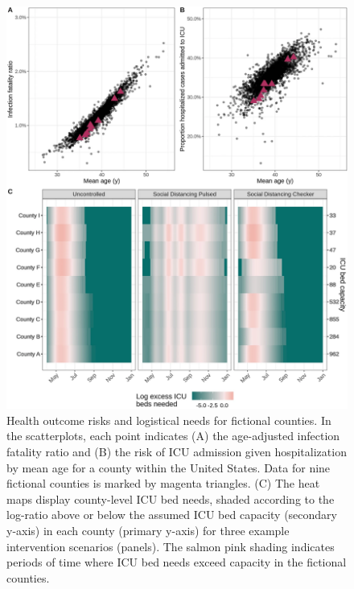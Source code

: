 {\begin{figure}[!htb]%
    \centering
    \includegraphics{fig_pipeline/fig3a}
    \caption[Health outcome risks and logistical needs for fictional counties]{Health outcome risks and logistical needs for fictional counties. In the scatterplots, each point indicates (A) the age-adjusted infection fatality ratio and (B) the risk of ICU admission given hospitalization by mean age for a county within the United States. Data for nine fictional counties is marked by magenta triangles. (C) The heat maps display county-level ICU bed needs, shaded according to the log-ratio above or below the assumed ICU bed capacity (secondary y-axis) in each county (primary y-axis) for three example intervention scenarios (panels). The salmon pink shading indicates periods of time where ICU bed needs exceed capacity in the fictional counties.}
    \label{fig:pipeline-outcome}
\end{figure}

}
